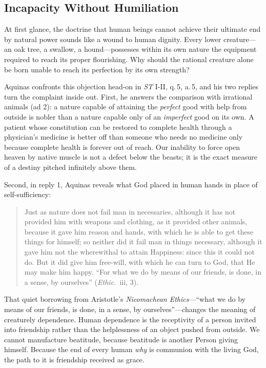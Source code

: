 \subsection*{Incapacity Without Humiliation}

At first glance, the doctrine that human beings cannot achieve their ultimate end by natural power sounds like a wound to human dignity. Every lower creature---an oak tree, a swallow, a hound---possesses within its own nature the equipment required to reach its proper flourishing. Why should the rational creature alone be born unable to reach its perfection by its own strength?

Aquinas confronts this objection head-on in \emph{ST} I-II, q.\,5, a.\,5, and his two replies turn the complaint inside out. First, he answers the comparison with irrational animals (ad 2): a nature capable of attaining the \emph{perfect} good with help from outside is nobler than a nature capable only of an \emph{imperfect} good on its own. A patient whose constitution can be restored to complete health through a physician's medicine is better off than someone who needs no medicine only because complete health is forever out of reach. Our inability to force open heaven by native muscle is not a defect below the beasts; it is the exact measure of a destiny pitched infinitely above them.

Second, in reply 1, Aquinas reveals what God placed in human hands in place of self-sufficiency:

\begin{quote}
Just as nature does not fail man in necessaries, although it has not provided him with weapons and clothing, as it provided other animals, because it gave him reason and hands, with which he is able to get these things for himself; so neither did it fail man in things necessary, although it gave him not the wherewithal to attain Happiness: since this it could not do. But it did give him free-will, with which he can turn to God, that He may make him happy. ``For what we do by means of our friends, is done, in a sense, by ourselves'' (\emph{Ethic.}\ iii, 3).
\end{quote}

That quiet borrowing from Aristotle's \emph{Nicomachean Ethics}---``what we do by means of our friends, is done, in a sense, by ourselves''---changes the meaning of creaturely dependence. Human dependence is the receptivity of a person invited into friendship rather than the helplessness of an object pushed from outside. We cannot manufacture beatitude, because beatitude is another Person giving himself. Because the end of every human \emph{why} is communion with the living God, the path to it is friendship received as grace.

